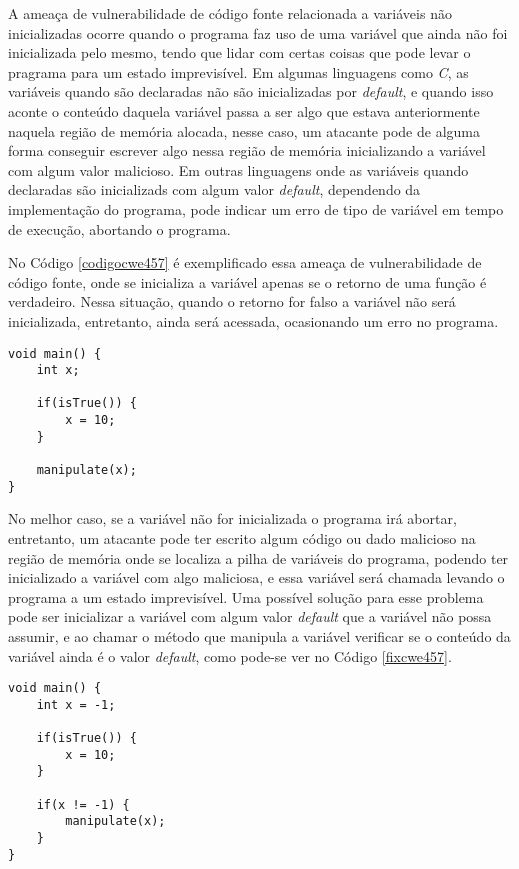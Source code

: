 A ameaça de vulnerabilidade de código fonte relacionada a variáveis não
inicializadas ocorre quando o programa faz uso de uma variável que ainda não foi
inicializada pelo mesmo, tendo que lidar com certas coisas que pode levar o
pragrama para um estado imprevisível. Em algumas linguagens como \textit{C}, as
variáveis quando são declaradas não são inicializadas por \textit{default}, e
quando isso aconte o conteúdo daquela variável passa a ser algo que estava
anteriormente naquela região de memória alocada, nesse caso, um atacante pode de
alguma forma conseguir escrever algo nessa região de memória inicializando a
variável com algum valor malicioso. Em outras linguagens onde as variáveis
quando declaradas são inicializads com algum valor \textit{default}, dependendo
da implementação do programa, pode indicar um erro de tipo de variável em tempo
de execução, abortando o programa.

No Código \ref{codigocwe457} é exemplificado essa ameaça de vulnerabilidade de
código fonte, onde se inicializa a variável apenas se o retorno de uma função é
verdadeiro. Nessa situação, quando o retorno for falso a variável não será
inicializada, entretanto, ainda será acessada, ocasionando um erro no programa.

\begin{lstlisting}[caption={Código exemplo CWE457}, label=codigocwe457]
void main() {
    int x;

    if(isTrue()) {
        x = 10;
    }

    manipulate(x);   
}
\end{lstlisting}

No melhor caso, se a variável não for inicializada o programa irá abortar,
entretanto, um atacante pode ter escrito algum código ou dado malicioso na
região de memória onde se localiza a pilha de variáveis do programa, podendo ter
inicializado a variável com algo maliciosa, e essa variável será chamada
levando o programa a um estado imprevisível. Uma possível solução para esse
problema pode ser inicializar a variável com algum valor \textit{default} que a
variável não possa assumir, e ao chamar o método que manipula a variável
verificar se o conteúdo da variável ainda é o valor \textit{default}, como
pode-se ver no Código \ref{fixcwe457}.

\begin{lstlisting}[caption={Evitando ameaça de vulnerabilidade CWE457},
label=fixcwe457]
void main() {
    int x = -1;

    if(isTrue()) {
        x = 10;
    }

    if(x != -1) {
        manipulate(x);   
    }
}
\end{lstlisting}

